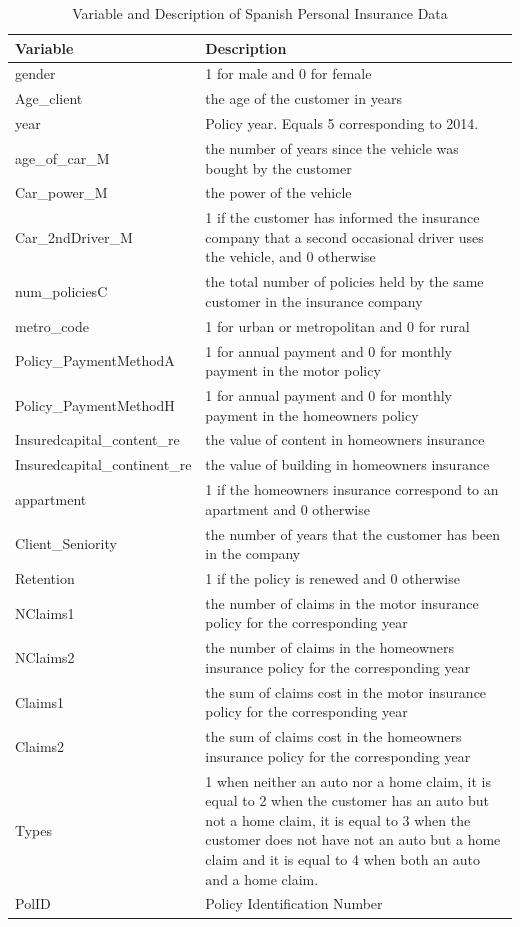 \documentclass[
]{book}
\begin{document}
\begin{table}

\caption{\label{tab:DescribeCover}Variable and Description of Spanish Personal Insurance Data}
\centering
\begin{tabular}[t]{ll}
\toprule
Variable & Description\\
\midrule
gender & 1 for male and 0 for female\\
Age\_client & the age of the customer in years\\
year & Policy year. Equals 5 corresponding to 2014.\\
age\_of\_car\_M & the number of years since the vehicle was bought by the customer\\
Car\_power\_M & the power of the vehicle\\
\addlinespace
Car\_2ndDriver\_M & 1 if the customer has informed the insurance company that a second occasional driver uses the vehicle, and 0 otherwise\\
num\_policiesC & the total number of policies held by the same customer in the insurance company\\
metro\_code & 1 for urban or metropolitan and 0 for rural\\
Policy\_PaymentMethodA & 1 for annual payment and  0 for monthly payment in the motor policy\\
Policy\_PaymentMethodH & 1 for annual payment and  0 for monthly payment in the homeowners policy\\
\addlinespace
Insuredcapital\_content\_re & the value of content in homeowners insurance\\
Insuredcapital\_continent\_re & the value of building in homeowners insurance\\
appartment & 1 if the homeowners insurance correspond to an apartment and 0 otherwise\\
Client\_Seniority & the number of years that the customer has been in the company\\
Retention & 1 if the policy is renewed and 0 otherwise\\
\addlinespace
NClaims1 & the number of claims in the motor insurance policy for the corresponding year\\
NClaims2 & the number of claims in the homeowners insurance policy for the corresponding year\\
Claims1 & the sum of claims cost  in the motor insurance policy for the corresponding year\\
Claims2 & the sum of claims cost  in the homeowners insurance policy for the corresponding year\\
Types & 1 when neither an auto nor a home claim, it is equal to  2 when the customer has an auto but not a home claim, it is equal to 3 when the customer does not have  not an auto but a home claim and it is equal to  4 when  both an auto and a home claim.\\
\addlinespace
PolID & Policy Identification Number\\
\bottomrule
\end{tabular}
\end{table}
\end{document}
